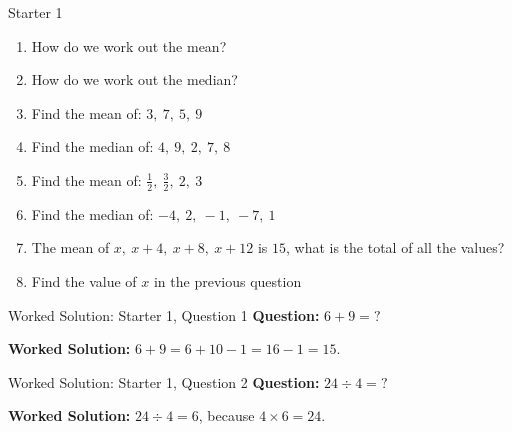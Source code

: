 \documentclass{beamer}
\newcommand{\ashow}[1]{\uncover<2->{\textcolor{red}{\small #1}}}
\newcommand{\ashowq}[1]{\alt<2->{\textcolor{red}{\small #1}}{?}}
\begin{document}
\begin{frame}{Starter 1}
\hypertarget{q-st1}{}
\vspace{-0.8em}

\footnotesize
\begin{enumerate}\itemsep2pt
  \item How do we work out the mean? \ashow{Add the values and divide by how many there are.}
  \item How do we work out the median? \ashow{Order the data and find the middle value.}
  \item Find the mean of: $3,\ 7,\ 5,\ 9$ \ashow{$=6$}
  \item Find the median of: $4,\ 9,\ 2,\ 7,\ 8$ \ashow{$=7$}
  \item Find the mean of: $\frac{1}{2},\ \frac{3}{2},\ 2,\ 3$ \ashow{$=\frac{7}{4}$}
  \item Find the median of: $-4,\ 2,\ -1,\ -7,\ 1$ \ashow{$=-1$}
  \item The mean of $x,\ x+4,\ x+8,\ x+12$ is $15$, what is the total of all the values? \ashow{$60$}
  \item Find the value of $x$ in the previous question \ashow{$x=9$}
\end{enumerate}

\end{frame}

\begin{frame}{Worked Solution: Starter 1, Question 1}
\hypertarget{work-st1}{}
\small
\textbf{Question:} \(6+9=\mathord{?}\)

\smallskip
\textbf{Worked Solution:} \(6+9=6+10-1=16-1=15\).
\end{frame}

\begin{frame}{Worked Solution: Starter 1, Question 2}
\small
\textbf{Question:} \(24 \div 4=\mathord{?}\)

\smallskip
\textbf{Worked Solution:} \(24 \div 4 = 6\), because \(4 \times 6 = 24\).
\end{frame}
\end{document}
